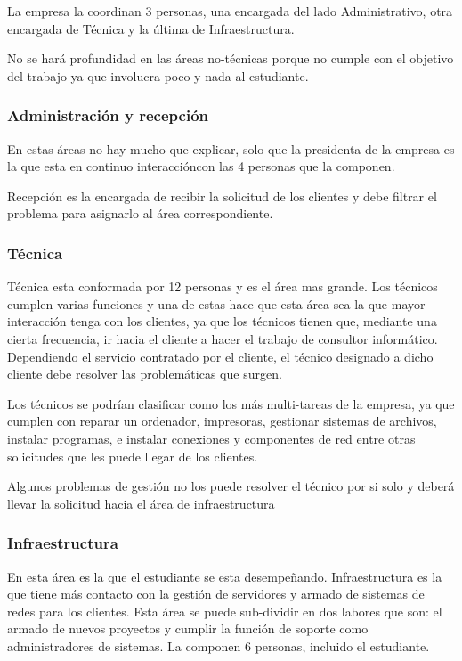 \documentclass[12pt,a4paper]{article}
\begin{document}
La empresa la coordinan 3 personas, una encargada del lado Administrativo, otra encargada de Técnica y la última de Infraestructura.

No se hará profundidad en las áreas no-técnicas porque no cumple con el objetivo del trabajo ya que involucra poco y nada al estudiante.

\subsubsection{Administración y recepción}
En estas áreas no hay mucho que explicar, solo que la presidenta de la empresa es la que esta en continuo interaccióncon las 4 personas que la componen.

Recepción es la encargada de recibir la solicitud de los clientes y debe filtrar el problema para asignarlo al área correspondiente. 

\subsubsection{Técnica}
Técnica esta conformada por 12 personas y es el área mas grande. Los técnicos cumplen varias funciones y una de estas hace que esta área sea la que mayor interacción tenga con los clientes, ya que los técnicos tienen que, mediante una cierta frecuencia, ir hacia el cliente a hacer el trabajo de consultor informático. Dependiendo el servicio contratado por el cliente, el técnico designado a dicho cliente debe resolver las problemáticas que surgen.

Los técnicos se podrían clasificar como los más multi-tareas de la empresa, ya que cumplen con reparar un ordenador, impresoras, gestionar sistemas de archivos, instalar programas, e instalar conexiones y componentes de red entre otras solicitudes que les puede llegar de los clientes.

Algunos problemas de gestión no los puede resolver el técnico por si solo y deberá llevar la solicitud hacia el área de infraestructura

\subsubsection{Infraestructura}
En esta área es la que el estudiante se esta desempeñando. Infraestructura es la que tiene más contacto con la gestión de servidores y armado de sistemas de redes para los clientes. Esta área se puede sub-dividir en dos labores que son: el armado de nuevos proyectos y cumplir la función de soporte como administradores de sistemas. La componen 6 personas, incluido el estudiante.
\end{document}
